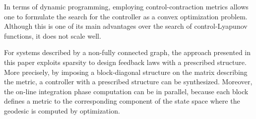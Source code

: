 \documentclass[10pt,twocolumn,twoside]{IEEEtran}
\theoremstyle{plain}
\theoremstyle{definition}
\theoremstyle{remark}
\begin{document}
In terms of dynamic programming, employing control-contraction metrics allows one to formulate the search for the controller as a convex optimization problem. Although this is one of its main advantages over the search of control-Lyapunov functions, it does not scale well.

For systems described by a non-fully connected graph, the approach presented in this paper exploits sparsity to design feedback laws with a prescribed structure. More precisely, by imposing a block-diagonal structure on the matrix describing the metric, a controller with a prescribed structure can be synthesized. Moreover, the on-line integration phase computation can be in parallel, because each block defines a metric to the corresponding component of the state space where the geodesic is computed by optimization.

\appendices


\ifCLASSOPTIONcaptionsoff
  \newpage
\fi





%
%
%
\printbibliography
\end{document}
